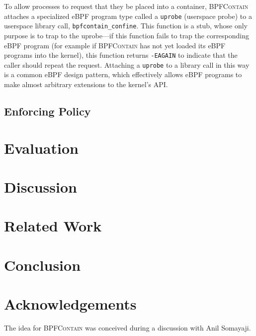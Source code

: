 \documentclass[dvipsnames, 12pt]{article}
\def\bpfcontain{\textsc{BPFContain}}
\begin{document}
To allow processes to request that they be placed into a container,
\bpfcontain{} attaches a specialized eBPF program type called a \texttt{uprobe}
(userspace probe) to a userspace library call, \texttt{bpfcontain\_confine}.
This function is a stub, whose only purpose is to trap to the uprobe---if this
function fails to trap the corresponding eBPF program (for example if
\bpfcontain{} has not yet loaded its eBPF programs into the kernel), this
function returns \texttt{-EAGAIN} to indicate that the caller should repeat the
request. Attaching a \texttt{uprobe} to a library call in this way is a common
eBPF design pattern, which effectively allows eBPF programs to make almost
arbitrary extensions to the kernel's API.

\subsection{Enforcing Policy}
\label{subsection:enforcing}


\section{Evaluation}


\section{Discussion}


\section{Related Work}


\section{Conclusion}


\section{Acknowledgements}

The idea for \bpfcontain{} was conceived during a discussion with Anil Somayaji.

\clearpage
\printbibliography
\end{document}
